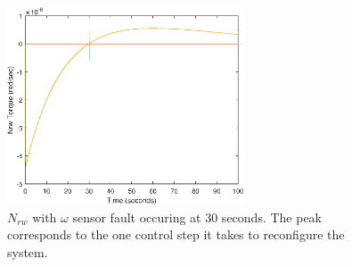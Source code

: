%

\begin{figure}
	\centering
	\includegraphics[width=70mm]{figures/omegaSensorfault_Nrw}
	\caption{$N_{rw}$ with $\omega$ sensor fault occuring at 30 seconds. The peak corresponds to the one control step it takes to reconfigure the system.}
		\label{fig:angvelcomp2}
\end{figure} 
